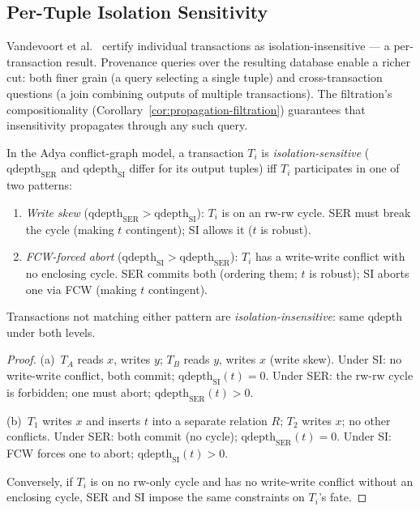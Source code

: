 \documentclass[acmsmall,review,anonymous]{acmart}
\theoremstyle{remark}
\numberwithin{definition}{section}
\numberwithin{theorem}{section}
\numberwithin{lemma}{section}
\numberwithin{corollary}{section}
\numberwithin{remark}{section}
\numberwithin{example}{section}
\numberwithin{observation}{section}
\numberwithin{assumption}{section}
\begin{document}
\subsection{Per-Tuple Isolation Sensitivity}

Vandevoort et al.~\cite{vandevoort2025mixed} certify individual
transactions as isolation-insensitive --- a per-transaction result.
Provenance queries over the resulting database enable a richer cut:
both finer grain (a query selecting a single tuple) and
cross-transaction questions (a join combining outputs of multiple
transactions).
The filtration's compositionality
(Corollary~\ref{cor:propagation-filtration}) guarantees that
insensitivity propagates through any such query.

\begin{proposition}
  \label{prop:ser-si-incomparable}
  In the Adya conflict-graph model, a transaction $T_i$ is
  \emph{isolation-sensitive} ($\mathrm{qdepth}_{\mathrm{SER}}$ and
  $\mathrm{qdepth}_{\mathrm{SI}}$ differ for its output tuples) iff
  $T_i$ participates in one of two patterns:
  \begin{enumerate}[nosep,label=(\alph*)]
    \item \emph{Write skew} ($\mathrm{qdepth}_{\mathrm{SER}} >
          \mathrm{qdepth}_{\mathrm{SI}}$):
          $T_i$ is on an rw-rw cycle.
          SER must break the cycle (making $t$ contingent); SI
          allows it ($t$ is robust).
    \item \emph{FCW-forced abort} ($\mathrm{qdepth}_{\mathrm{SI}} >
          \mathrm{qdepth}_{\mathrm{SER}}$):
          $T_i$ has a write-write conflict with no enclosing cycle.
          SER commits both (ordering them; $t$ is robust); SI aborts
          one via FCW (making $t$ contingent).
  \end{enumerate}
  Transactions not matching either pattern are
  \emph{isolation-insensitive}: same qdepth under both levels.
\end{proposition}
\begin{proof}
  (a)~$T_A$ reads $x$, writes $y$; $T_B$ reads $y$, writes $x$
  (write skew).
  Under SI: no write-write conflict, both commit;
  $\mathrm{qdepth}_{\mathrm{SI}}(t) = 0$.
  Under SER: the rw-rw cycle is forbidden; one must abort;
  $\mathrm{qdepth}_{\mathrm{SER}}(t) > 0$.

  (b)~$T_1$ writes $x$ and inserts $t$ into a separate relation $R$;
  $T_2$ writes $x$; no other conflicts.
  Under SER: both commit (no cycle);
  $\mathrm{qdepth}_{\mathrm{SER}}(t) = 0$.
  Under SI: FCW forces one to abort;
  $\mathrm{qdepth}_{\mathrm{SI}}(t) > 0$.

  Conversely, if $T_i$ is on no rw-only cycle and has no write-write
  conflict without an enclosing cycle, SER and SI impose the same
  constraints on $T_i$'s fate.
\end{proof}
\end{document}

